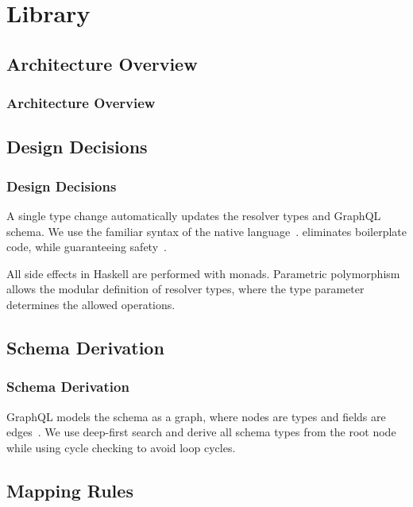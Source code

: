 \section{Library}


\subsection{Architecture Overview}

\begin{frame}\frametitle{Architecture Overview}


\end{frame}

\subsection{Design Decisions} 
\begin{frame}\frametitle{Design Decisions}

\begin{itemize}
     A single type change automatically updates the resolver types and GraphQL schema. 
      We use the familiar syntax of the native language~\cite{edsl-modeling}.
     eliminates boilerplate code, while guaranteeing safety~\cite{datatype-generic-programming, scrap-your-boilerplate}.
    
     All side effects in Haskell are performed with monads.
     Parametric polymorphism allows the modular definition of resolver types, where the type parameter determines the allowed operations.
\end{itemize}
\end{frame}

\subsection{Schema Derivation} 
\begin{frame}\frametitle{Schema Derivation}

GraphQL models the schema as a graph, where nodes are types and fields are edges~\cite{migrating-to-gql}. We use deep-first search and derive all schema types from the root node while using cycle checking to avoid loop cycles.

\end{frame}

\subsection{Mapping Rules}

